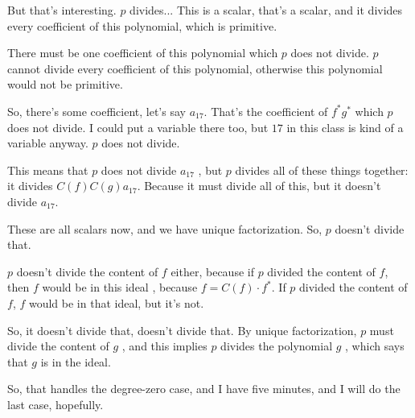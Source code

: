 \begin{proofWrapper}
\begin{speech}[00:34:58 - 00:36:57]
But that's interesting. $p$ divides... This is a scalar, that's a scalar, and it divides every coefficient of this polynomial, which is primitive.

There must be one coefficient of this polynomial which $p$ does not divide. $p$ cannot divide every coefficient of this polynomial, otherwise this polynomial would not be primitive.

So, there's some coefficient, let's say $a_{17}$. That's the coefficient  of $f^* g^*$  which $p$ does not divide.  I could put a variable there too, but $17$ in this class is kind of a variable anyway. $p$ does not divide.

This means that $p$ does not divide $a_{17}$ , but $p$ divides all of these things together: it divides $C(f) C(g) a_{17}$.  Because it must divide all of this, but it doesn't divide $a_{17}$.

These are all scalars now, and we have unique factorization. So, $p$ doesn't divide that.

$p$ doesn't divide the content of $f$ either, because if $p$ divided the content of $f$, then $f$ would be in this ideal , because $f = C(f) \cdot f^*$. If $p$ divided the content of $f$, $f$ would be in that ideal, but it's not.

So, it doesn't divide that, doesn't divide that. By unique factorization, $p$ must divide the content of $g$ , and this implies $p$ divides the polynomial $g$ , which says that $g$ is in the ideal. 

So, that handles the degree-zero case, and I have five minutes, and I will do the last case, hopefully.
\end{speech}


\end{proofWrapper}
